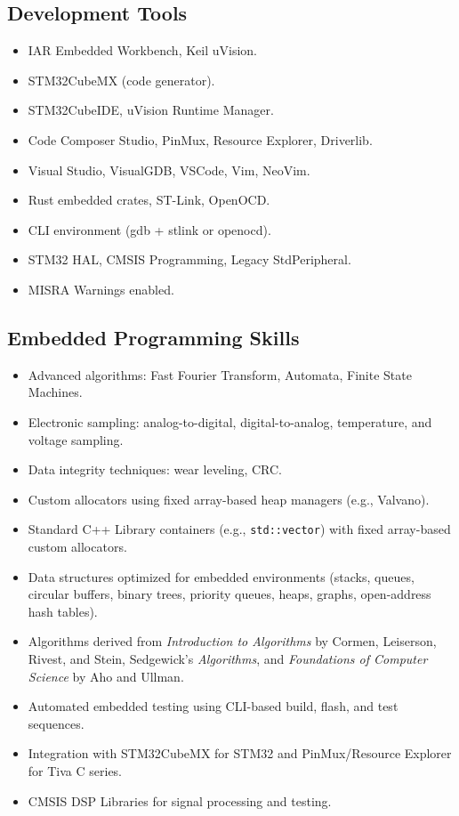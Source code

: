 \documentclass{article}
\begin{document}
\subsection*{Development Tools}
\begin{itemize}
    \item IAR Embedded Workbench, Keil uVision.
    \item STM32CubeMX (code generator).
    \item STM32CubeIDE, uVision Runtime Manager.
    \item Code Composer Studio, PinMux, Resource Explorer, Driverlib.
    \item Visual Studio, VisualGDB, VSCode, Vim, NeoVim.
    \item Rust embedded crates, ST-Link, OpenOCD.
    \item CLI environment (gdb + stlink or openocd).
    \item STM32 HAL, CMSIS Programming, Legacy StdPeripheral.
    \item MISRA Warnings enabled.
\end{itemize}

\subsection*{Embedded Programming Skills}
\begin{itemize}
    \item Advanced algorithms: Fast Fourier Transform, Automata, Finite State Machines.
    \item Electronic sampling: analog-to-digital, digital-to-analog, temperature, and voltage sampling.
    \item Data integrity techniques: wear leveling, CRC.
    \item Custom allocators using fixed array-based heap managers (e.g., Valvano).
    \item Standard C++ Library containers (e.g., \texttt{std::vector}) with fixed array-based custom allocators.
    \item Data structures optimized for embedded environments (stacks, queues, circular buffers, binary trees, priority queues, heaps, graphs, open-address hash tables).
    \item Algorithms derived from \textit{Introduction to Algorithms} by Cormen, Leiserson, Rivest, and Stein, Sedgewick’s \textit{Algorithms}, and \textit{Foundations of Computer Science} by Aho and Ullman.
    \item Automated embedded testing using CLI-based build, flash, and test sequences.
    \item Integration with STM32CubeMX for STM32 and PinMux/Resource Explorer for Tiva C series.
    \item CMSIS DSP Libraries for signal processing and testing.
\end{itemize}
\end{document}
